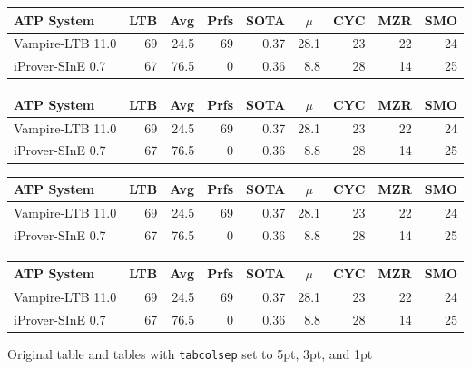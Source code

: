 \documentclass{easychair}
\begin{document}
\begin{figure}[tb]\small
\begin{center}
  \begin{tabular}{lrrrrrrrr}
    \hline
    ATP System            & LTB & Avg  &Prfs & SOTA & \multicolumn{1}{c}{$\mu$} & CYC & MZR & SMO \\
   \hline
    Vampire-LTB 11.0      &  69 & 24.5 &  69 & 0.37 & 28.1 &  23 &  22 &  24 \\
    iProver-SInE 0.7      &  67 & 76.5 &   0 & 0.36 &  8.8 &  28 &  14 &  25 \\
   \hline
  \end{tabular}
\end{center}

\begin{center}\renewcommand{\tabcolsep}{5pt}
  \begin{tabular}{lrrrrrrrr}
    \hline
    ATP System            & LTB & Avg  &Prfs & SOTA & \multicolumn{1}{c}{$\mu$} & CYC & MZR & SMO \\
   \hline
    Vampire-LTB 11.0      &  69 & 24.5 &  69 & 0.37 & 28.1 &  23 &  22 &  24 \\
    iProver-SInE 0.7      &  67 & 76.5 &   0 & 0.36 &  8.8 &  28 &  14 &  25 \\
   \hline
  \end{tabular}
\end{center}

\begin{center}\renewcommand{\tabcolsep}{3pt}
  \begin{tabular}{lrrrrrrrr}
    \hline
    ATP System            & LTB & Avg  &Prfs & SOTA & \multicolumn{1}{c}{$\mu$} & CYC & MZR & SMO \\
   \hline
    Vampire-LTB 11.0      &  69 & 24.5 &  69 & 0.37 & 28.1 &  23 &  22 &  24 \\
    iProver-SInE 0.7      &  67 & 76.5 &   0 & 0.36 &  8.8 &  28 &  14 &  25 \\
   \hline
  \end{tabular}
\end{center}

\begin{center}\renewcommand{\tabcolsep}{1pt}
  \begin{tabular}{lrrrrrrrr}
    \hline
    ATP System            & LTB & Avg  &Prfs & SOTA & \multicolumn{1}{c}{$\mu$} & CYC & MZR & SMO \\
   \hline
    Vampire-LTB 11.0      &  69 & 24.5 &  69 & 0.37 & 28.1 &  23 &  22 &  24 \\
    iProver-SInE 0.7      &  67 & 76.5 &   0 & 0.36 &  8.8 &  28 &  14 &  25 \\
   \hline
  \end{tabular}
\end{center}
\normalsize

\caption{Original table and tables with \texttt{tabcolsep} set to 5pt,
  3pt, and 1pt
  \label{fig:tabcolsep}}

\end{figure}
\end{document}
